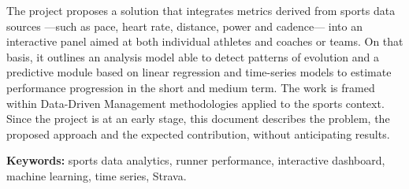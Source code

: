 The project proposes a solution that integrates metrics derived from sports data
sources ---such as pace, heart rate, distance, power and cadence--- into an
interactive panel aimed at both individual athletes and coaches or teams. On
that basis, it outlines an analysis model able to detect patterns of evolution
and a predictive module based on linear regression and time-series models to
estimate performance progression in the short and medium term. The work is
framed within Data-Driven Management methodologies applied to the sports
context. Since the project is at an early stage, this document describes the
problem, the proposed approach and the expected contribution, without
anticipating results.

\vspace{0.5\baselineskip}
\noindent\textbf{Keywords:} sports data analytics, runner performance,
interactive dashboard, machine learning, time series, Strava.
